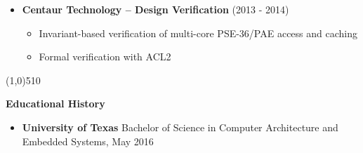 \documentclass{report}
\newcommand{\cut}{\begin{center} \line(1,0){510} \end{center}}
\begin{document}
\begin{itemize}[label=$\cdot$]
\item \textbf{Centaur Technology -- Design Verification} (2013 - 2014)
  \begin{itemize}[label=$\circ$]
  \item Invariant-based verification of multi-core PSE-36/PAE access and caching
  \item Formal verification with ACL2
  \end{itemize}

\end{itemize}

\cut{}

\textbf{Educational History}
\begin{itemize}[label=$\cdot$]
\item \textbf{University of Texas} Bachelor of Science in Computer Architecture and Embedded Systems, May 2016
\end{itemize}
\end{document}
